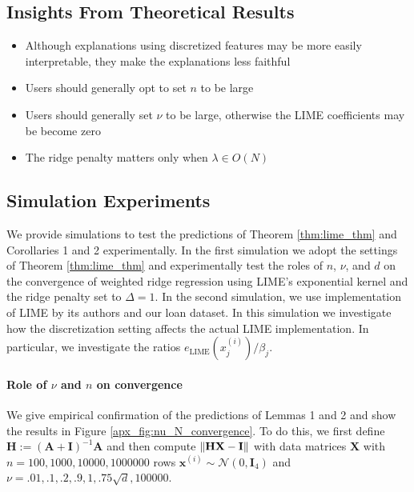 \documentclass[mnsc,blindrev]{informs3}
\begin{document}
            
        \subsection*{Insights From Theoretical Results}
            \begin{itemize}
                \item Although explanations using discretized features may be more easily interpretable, they make the explanations less faithful
                \item Users should generally opt to set $n$ to be large 
                \item Users should generally set $\nu$ to be large, otherwise the LIME coefficients may be become zero
                \item The ridge penalty matters only when $\lambda \in O(N)$
            \end{itemize}
    
            \subsection*{Simulation Experiments}
                \label{apx_sec:simulation_experiments}
                We provide simulations to test the predictions of Theorem \ref{thm:lime_thm} and Corollaries 1 and 2 experimentally. In the first simulation we adopt the settings of Theorem \ref{thm:lime_thm} and experimentally test the roles of $n$, $\nu$, and $d$ on the convergence of weighted ridge regression using LIME's exponential kernel and the ridge penalty set to $\Delta=1$. In the second simulation, we use implementation of LIME by its authors and our loan dataset. In this simulation we investigate how the discretization setting affects the actual LIME implementation. In particular, we investigate the ratios $e_{\text{LIME}}(x^{(i)}_j)/\beta_j$. 
    

                
                \paragraph{Role of $\nu$ and $n$ on convergence}
                    We give empirical confirmation of the predictions of Lemmas 1 and 2 and show the results in Figure \ref{apx_fig:nu_N_convergence}. To do this, we first define $\mathbf{H}:=(\mathbf{A} + \mathbf{I})^{-1}\mathbf{A}$ and then compute $\norm{\mathbf{H}\mathbf{X} - \mathbf{I}}$ with data matrices $\mathbf{X}$ with $n=100,1000,10000,1000000$ rows  $\mathbf{x}^{(i)} \sim \mathcal{N}(0,\mathbf{I}_4)$ and $\nu=.01,.1,.2,.9,1,.75\sqrt{d},100000$. 
\end{document}
